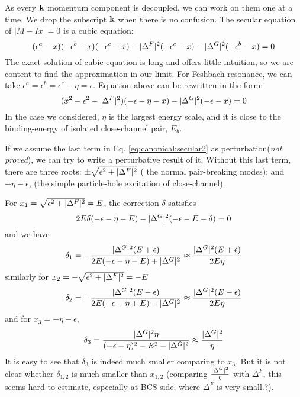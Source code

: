 As every $\mathbf{k}$ momentum component is decoupled, we can work on them one at a time.  We drop the subscript $\mathbf{k}$ when there is no confusion.   The secular equation of $|M-Ix|=0$ is a cubic equation: 
\begin{equation}
(\epsilon^{a}-x)(-\epsilon^{b}-x)(-\epsilon^{c}-x)-\lvert{\Delta^{F}}\rvert^{2}(-\epsilon^{c}-x)-\lvert{\Delta^{G}}\rvert^{2}(-\epsilon^{b}-x)=0
\end{equation}
The exact solution of cubic equation is long and offers little intuition, so we are content to find the approximation in our limit. For Feshbach resonance, we can take $\epsilon^{a}=\epsilon^{b}=\epsilon^{c}-\eta=\epsilon$.  Equation above can be rewritten in the form:
\begin{equation}\label{eq:canonical:secular2}
(x^{2}-\epsilon^{2}-\lvert{\Delta^{F}}\rvert^{2})(-\epsilon-\eta-x)-\lvert{\Delta^{G}}\rvert^{2}(-\epsilon-x)=0
\end{equation}
In the case we considered, $\eta$ is the largest energy scale, and it is close to the binding-energy  of isolated close-channel pair, $E_{b}$.  

If we assume the last term in Eq. \ref{eq:canonical:secular2} as perturbation(\emph{not proved}), we can try to write a perturbative result of it.  Without this last term, there are three roots:  $\pm\sqrt{\epsilon^{2}+\lvert{\Delta^{F}}\rvert^{2}}$ ( the normal pair-breaking modes); and $-\eta-\epsilon$, (the simple particle-hole excitation of close-channel).  

For $x_{1}=\sqrt{\epsilon^{2}+\lvert{\Delta^{F}}\rvert^{2}}=E$, the correction $\delta$ satisfies
\begin{equation*}
2E\delta(-\epsilon-\eta-E)-\lvert{\Delta^{G}}\rvert^{2}(-\epsilon-E-\delta)=0
\end{equation*}
and we have 
\begin{equation}
\delta_{1}=-\frac{\lvert{\Delta^{G}}\rvert^{2}(E+\epsilon)}{2E(-\epsilon-\eta-E)+\lvert{\Delta^{G}}\rvert^{2}}
	\approx\frac{\lvert{\Delta^{G}}\rvert^{2}(E+\epsilon)}{2E\eta}
\end{equation}
similarly for $x_{2}=-\sqrt{\epsilon^{2}+\lvert{\Delta^{F}}\rvert^{2}}=-E$
\begin{equation}
\delta_{2}=-\frac{\lvert{\Delta^{G}}\rvert^{2}(E-\epsilon)}{2E(-\epsilon-\eta+E)-\lvert{\Delta^{G}}\rvert^{2}}
	\approx\frac{\lvert{\Delta^{G}}\rvert^{2}(E-\epsilon)}{2E\eta}
\end{equation}
and for $x_{3}=-\eta-\epsilon$,
\begin{equation}
\delta_{3}=\frac{\lvert{\Delta^{G}}\rvert^{2}\eta}{(-\epsilon-\eta)^{2}-E^{2}-\lvert{\Delta^{G}}\rvert^{2}}
	\approx\frac{\lvert{\Delta^{G}}\rvert^{2}}{\eta}
\end{equation}
It is easy to see that $\delta_{3}$ is indeed much smaller comparing to $x_{3}$.  But it is not clear whether $\delta_{1,2}$ is much smaller than $x_{1,2}$ (comparing $\frac{\lvert{\Delta^{G}}\rvert^{2}}{\eta}$ with $\Delta^F$, this seems hard to estimate, especially at BCS side, where $\Delta^F$ is very small.?).  

